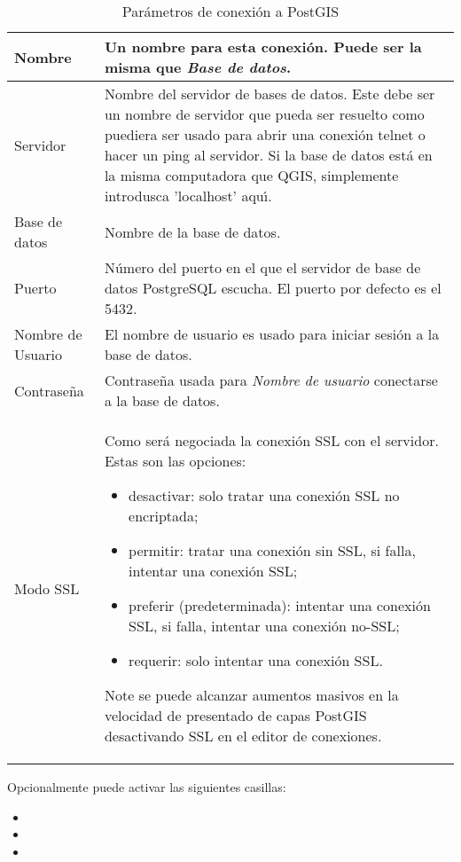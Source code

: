 \begin{table}[ht]
\centering
\caption{Par\'ametros de conexi\'on a PostGIS}\label{tab:postgis_connection_parms}\medskip
 \begin{tabular}{|l|p{5in}|}
\hline Nombre & Un nombre para esta conexi\'on. Puede ser la misma que \textsl{Base de datos}.
\\
\hline Servidor \index{PostgreSQL!host}
& Nombre del servidor de bases de datos. Este debe ser un nombre de servidor que pueda ser resuelto como puediera
ser usado para abrir una conexi\'on telnet o hacer un ping al servidor. Si la base de datos est\'a 
en la misma computadora que QGIS, simplemente introdusca 'localhost' aqu\'{\i}. \\
\hline Base de datos \index{PostgreSQL!database} & Nombre de la base de datos.  \\
\hline Puerto \index{PostgreSQL!port}& N\'umero del puerto en el que el servidor 
de base de datos PostgreSQL escucha. El puerto por defecto es el 5432.\\
\hline Nombre de Usuario \index{PostgreSQL!username}& El nombre de usuario es usado para iniciar sesi\'on
a la base de datos. \\
\hline Contrase\~na \index{PostgreSQL!password}& Contrase\~na usada para
\textsl{Nombre de usuario} conectarse a la base de datos.\\
\hline Modo SSL \index{PostgreSQL!sslmode}& Como ser\'a negociada la conexi\'on SSL con el servidor. Estas son las opciones: 
\begin {itemize}
\item desactivar: solo tratar una conexi\'on SSL no encriptada;
\item permitir: tratar una conexi\'on sin SSL, si falla, intentar una conexi\'on SSL;
\item preferir (predeterminada): intentar una conexi\'on SSL, si falla, intentar una conexi\'on no-SSL;
\item requerir: solo intentar una conexi\'on SSL.
\end {itemize}
Note se puede alcanzar aumentos masivos en la velocidad de presentado de capas PostGIS desactivando SSL en el editor de conexiones. \\
\hline
\end{tabular}
\end{table}

Opcionalmente puede activar las siguientes casillas:

\begin{itemize}
\item {}
\item {}
\item {}
\end{itemize}

